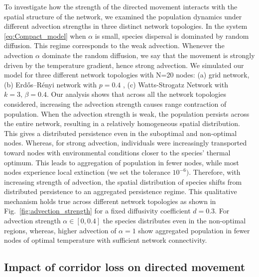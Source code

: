 \documentclass[12pt]{article}
\begin{document}
To investigate how the strength of the directed movement interacts with the spatial structure of the network, we examined the population dynamics under different advection strengths in three distinct network topologies. In the system \eqref{eq:Compact_model} when $\alpha$ is small, species dispersal is dominated by random diffusion. This regime corresponds to the weak advection. Whenever the advection $\alpha$ dominate the random diffusion, we say that the movement is strongly driven by the temperature gradient, hence strong advection. We simulated our model for three different network topologies with N=20 nodes: (a) grid network, (b) Erd\H{o}s--R\'enyi network with $p=0.4$ \cite{erdos1961evolution}, (c) Watts-Strogatz Network with $k=3,\,\beta=0.4.$ Our analysis shows that across all the network topologies considered, increasing the advection strength causes range contraction of population. When the advection strength is weak, the population persists across the entire network, resulting in a relatively homogeneous spatial distribution. This gives a distributed persistence even in the suboptimal and non-optimal nodes. Whereas, for strong advection, individuals were increasingly transported toward nodes with environmental conditions closer to the species' thermal optimum. This leads to aggregation of population in fewer nodes, while most nodes experience local extinction (we set the tolerance $10^{-6})$. Therefore, with increasing strength of advection, the spatial distribution of species shifts from distributed persistence to an aggregated persistence regime. This qualitative mechanism holds true across different network topologies as shown in Fig.~\ref{fig:advection_strength} for a fixed diffusivity coefficient $d=0.3.$ For advection strength $\alpha \in [0,0.4]$ the species distributes even in the non-optimal regions, whereas, higher advection of $\alpha=1$ show aggregated population in fewer nodes of optimal temperature with sufficient network connectivity.




\subsection{Impact of corridor loss on directed movement}
\end{document}

